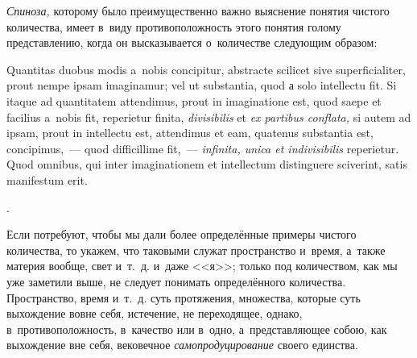 {\em Спиноза,} которому было преимущественно важно выяснение понятия чистого
количества, имеет в~виду противоположность этого понятия голому представлению,
когда он высказывается о~количестве следующим образом:

\vspace{3mm}

\begin{footnotesize}\fontsize{10}{13}\selectfont
Quantitas duobus modis a~nobis conci\-pitur, abs\-trac\-te scili\-cet
sive super\-fi\-ci\-ali\-ter, prout nempe ipsam ima\-gina\-mur; vel ut
sub\-stan\-tia, quod а solo intel\-lectu fit. Si itaque ad quanti\-tatem
atten\-di\-mus, prout in imagin\-ati\-one est, quod saepe et faci\-lius
a~nobis fit, repe\-rietur finita, {\em divi\-sibi\-lis} et
{\em ex parti\-bus con\-flata,} si autem ad ipsam, prout in intel\-lectu est,
atten\-di\-mus et eam, quate\-nus sub\-stan\-tia est, con\-cipi\-mus,~--- quod
dif\-ficil\-lime fit,~--- {\em infi\-nita, unica et indi\-vi\-si\-bi\-lis}
re\-pe\-rietur. Quod omni\-bus, qui inter ima\-gi\-na\-tio\-nem et
intel\-lectum dis\-tin\-guere scive\-rint, satis mani\-fes\-tum erit.\par
\end{footnotesize}

\vspace{3mm}

.

Если потребуют, чтобы мы дали более определённые примеры чистого количества,
то укажем, что таковыми служат пространство и~время, а~также материя
вообще, свет и~т.~д. и~даже <<я>>; только под количеством, как мы уже
заметили выше, не следует понимать определённого количества. Пространство,
время и~т.~д. суть протяжения, множества, которые суть выхождение вовне себя,
истечение, не переходящее, однако, в~противоположность, в~качество или
в~одно, а~представляющее собою, как выхождение вне себя, вековечное
{\em самопродуцирование} своего единства.

